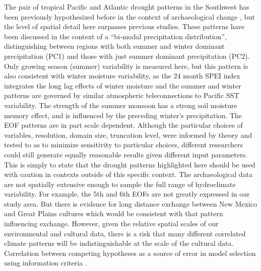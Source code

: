 \documentclass[10pt]{iopart}
\begin{document}
The pair of tropical Pacific and Atlantic drought patterns in the Southwest has been previously hypothesized before in the context of archaeological change \parencite{Dean1996,Cordell2007}, but the level of spatial detail here surpasses previous studies. These patterns have been discussed in the context of a ``bi-modal precipitation distribution'', distinguishing between regions with both summer and winter dominant precipitation (PC1) and those with just summer dominant precipitation (PC2). Only growing season (summer) variability is measured here, but this pattern is also consistent with winter moisture variability, as the 24 month SPEI index integrates the long lag effects of winter moisture and the summer and winter patterns are governed by similar atmospheric teleconnections to Pacific SST variability. The strength of the summer monsoon has a strong soil moisture memory effect, and is influenced by the preceding winter's precipitation. The EOF patterns are in part scale dependent. Although the particular choices of variables, resolution, domain size, truncation level, were informed by theory and tested to as to minimize sensitivity to particular choices, different researchers could still generate equally reasonable results given  different input parameters. This is simply to state that the drought patterns highlighted here should be used with caution in contexts outside of this specific context. The archaeological data are not spatially extensive enough to sample the full range of hydroclimate variability. For example, the 5th and 6th EOFs are not greatly expressed in our study area. But there is evidence for long distance exchange between New Mexico and Great Plains cultures \parencite{Spielmann1983} which would be consistent with that pattern influencing exchange. However, given the relative spatial scales of our environmental and cultural data, there is a risk that many different correlated climate patterns will be indistinguishable at the scale of the cultural data. Correlation between competing hypotheses as a source of error in model selection using information criteria \parencite{Shirk2018}.

\end{document}
